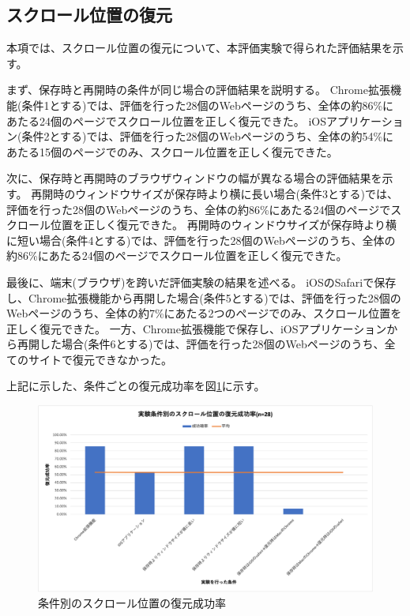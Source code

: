 \subsection{スクロール位置の復元}
本項では、スクロール位置の復元について、本評価実験で得られた評価結果を示す。

まず、保存時と再開時の条件が同じ場合の評価結果を説明する。
Chrome拡張機能(条件1とする)では、評価を行った28個のWebページのうち、全体の約86\%にあたる24個のページでスクロール位置を正しく復元できた。
iOSアプリケーション(条件2とする)では、評価を行った28個のWebページのうち、全体の約54\%にあたる15個のページでのみ、スクロール位置を正しく復元できた。

次に、保存時と再開時のブラウザウィンドウの幅が異なる場合の評価結果を示す。
再開時のウィンドウサイズが保存時より横に長い場合(条件3とする)では、評価を行った28個のWebページのうち、全体の約86\%にあたる24個のページでスクロール位置を正しく復元できた。
再開時のウィンドウサイズが保存時より横に短い場合(条件4とする)では、評価を行った28個のWebページのうち、全体の約86\%にあたる24個のページでスクロール位置を正しく復元できた。

最後に、端末(ブラウザ)を跨いだ評価実験の結果を述べる。
iOSのSafariで保存し、Chrome拡張機能から再開した場合(条件5とする)では、評価を行った28個のWebページのうち、全体の約7\%にあたる2つのページでのみ、スクロール位置を正しく復元できた。
一方、Chrome拡張機能で保存し、iOSアプリケーションから再開した場合(条件6とする)では、評価を行った28個のWebページのうち、全てのサイトで復元できなかった。

上記に示した、条件ごとの復元成功率を図\ref{fig:success-rate-scroll-position}に示す。

\begin{figure}[htbp]
  \label{fig:success-rate-scroll-position}
  \begin{center}
    \includegraphics[bb=0 0 693 386.8,width=15cm]{img/060_evaluation/result/scroll_position/success-rate-scroll-position.pdf}
  \end{center}
  \caption{条件別のスクロール位置の復元成功率}
\end{figure}
